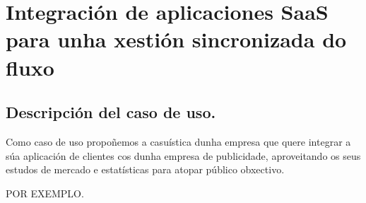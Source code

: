 \chapter{Integración de aplicaciones SaaS para unha xestión sincronizada do fluxo}
\label{chap:casouso}

\section{Descripción del caso de uso.}

Como caso de uso propoñemos a casuística dunha empresa que quere integrar a súa aplicación de clientes cos dunha empresa de publicidade, aproveitando os seus estudos de mercado e estatísticas para atopar público obxectivo.

POR EXEMPLO.